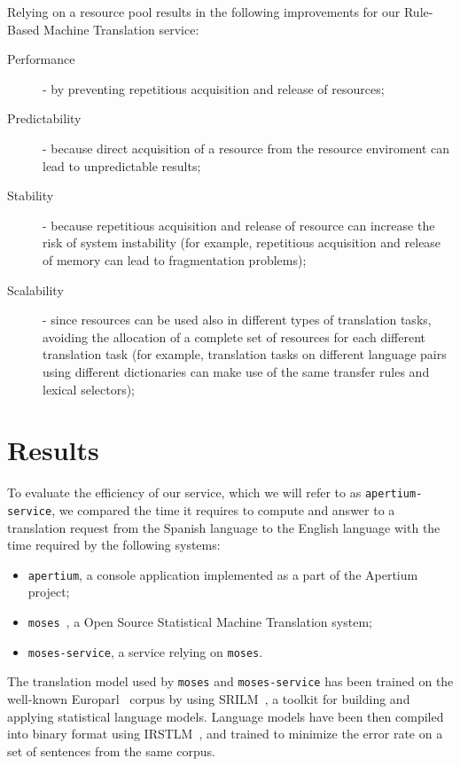 \documentclass[11pt]{article}
\begin{document}
Relying on a resource pool results in the following improvements for our Rule-Based Machine Translation service:

\begin{description}
 \item[Performance] - by preventing repetitious acquisition and release of resources;
 \item[Predictability] - because direct acquisition of a resource from the resource enviroment can lead to unpredictable results;
 \item[Stability] - because repetitious acquisition and release of resource can increase the risk of system instability (for example, repetitious acquisition and release of memory can lead to fragmentation problems);
 \item[Scalability] - since resources can be used also in different types of translation tasks, avoiding the allocation of a complete set of resources for each different translation task (for example, translation tasks on different language pairs using different dictionaries can make use of the same transfer rules and lexical selectors);
\end{description}

\section{Results}

To evaluate the efficiency of our service, which we will refer to as {\tt apertium-service}, we compared the time it requires to compute and answer to a translation request from the Spanish language to the English language with the time required by the following systems:

\begin{itemize}
 \item {\tt apertium}, a console application implemented as a part of the Apertium project;
 \item {\tt moses}~\citep{moses}, a Open Source Statistical Machine Translation system;
 \item {\tt moses-service}, a service relying on {\tt moses}.
\end{itemize}

The translation model used by {\tt moses} and {\tt moses-service} has been trained on the well-known Europarl~\citep{europarl} corpus by using SRILM~\citep{srilm}, a toolkit for building and applying statistical language models. Language models have been then compiled into binary format using IRSTLM~\citep{irstlm}, and trained to minimize the error rate on a set of sentences from the same corpus. 
\end{document}
